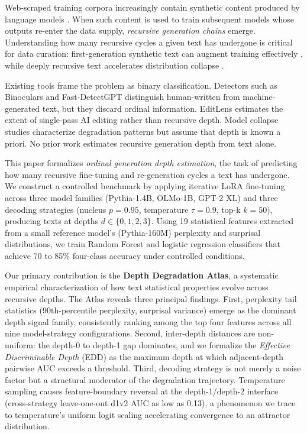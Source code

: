\documentclass[11pt,a4paper]{article}
\begin{document}
Web-scraped training corpora increasingly contain synthetic content produced by language models \citep{radford2019language,brown2020language}.
When such content is used to train subsequent models whose outputs re-enter the data supply, \emph{recursive generation chains} emerge.
Understanding how many recursive cycles a given text has undergone is critical for data curation: first-generation synthetic text can augment training effectively \citep{honovich2023unnatural}, while deeply recursive text accelerates distribution collapse \citep{shumailov2024model,alemohammad2024selfconsuming}.

Existing tools frame the problem as binary classification.
Detectors such as Binoculars \citep{hans2024spotting} and Fast-DetectGPT \citep{bao2024fast} distinguish human-written from machine-generated text, but they discard ordinal information.
EditLens \citep{wang2024editlens} estimates the extent of single-pass AI editing rather than recursive depth.
Model collapse studies \citep{dohmatob2024tale,gerstgrasser2024model,drayson2025scaling} characterize degradation patterns but assume that depth is known a priori.
No prior work estimates recursive generation depth from text alone.

This paper formalizes \emph{ordinal generation depth estimation}, the task of predicting how many recursive fine-tuning and re-generation cycles a text has undergone.
We construct a controlled benchmark by applying iterative LoRA fine-tuning across three model families (Pythia-1.4B, OLMo-1B, GPT-2 XL) and three decoding strategies (nucleus $p{=}0.95$, temperature $\tau{=}0.9$, top-k $k{=}50$), producing texts at depths $d \in \{0,1,2,3\}$.
Using 19 statistical features extracted from a small reference model's (Pythia-160M) perplexity and surprisal distributions, we train Random Forest and logistic regression classifiers that achieve 70 to 85\% four-class accuracy under controlled conditions.

Our primary contribution is the \textbf{Depth Degradation Atlas}, a systematic empirical characterization of how text statistical properties evolve across recursive depths.
The Atlas reveals three principal findings.
First, perplexity tail statistics (90th-percentile perplexity, surprisal variance) emerge as the dominant depth signal family, consistently ranking among the top four features across all nine model-strategy configurations.
Second, inter-depth distances are non-uniform: the depth-0 to depth-1 gap dominates, and we formalize the \emph{Effective Discriminable Depth} (EDD) as the maximum depth at which adjacent-depth pairwise AUC exceeds a threshold.
Third, decoding strategy is not merely a noise factor but a structural moderator of the degradation trajectory.
Temperature sampling causes feature-boundary reversal at the depth-1/depth-2 interface (cross-strategy leave-one-out d1v2 AUC as low as 0.13), a phenomenon we trace to temperature's uniform logit scaling accelerating convergence to an attractor distribution.
\end{document}
